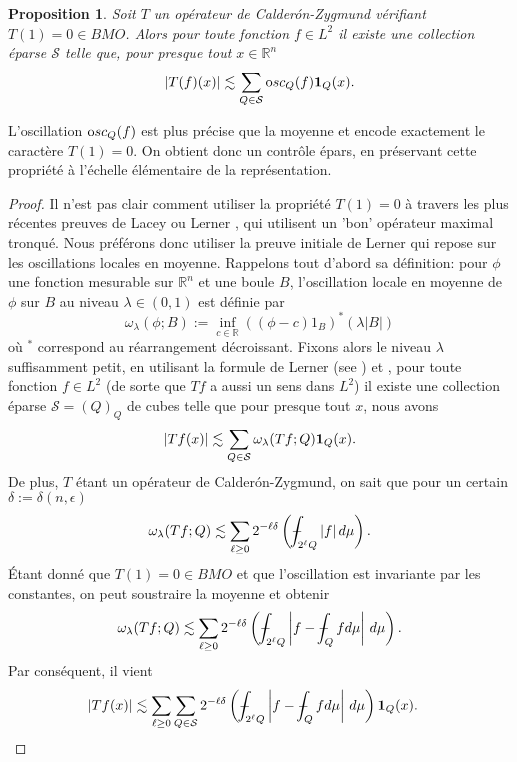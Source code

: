 \documentclass[11pt]{amsart}
\newtheorem{proposition}[theorem]{Proposition}
\newcommand{\rr}{\mathbb}
\newcommand{\osc}{{\textrm osc}}
\newcommand{\mcS}{{\mathcal S}}
\def\Xint#1{\mathchoice
   {\XXint\displaystyle\textstyle{#1}}%
   {\XXint\textstyle\scriptstyle{#1}}%
   {\XXint\scriptstyle\scriptscriptstyle{#1}}%
   {\XXint\scriptscriptstyle\scriptscriptstyle{#1}}%
   \!\int}
\def\XXint#1#2#3{{\setbox0=\hbox{$#1{#2#3}{\int}$}
     \vcenter{\hbox{$#2#3$}}\kern-.5\wd0}}
\def\aver#1{\Xint-_{#1}}
\begin{document}
\begin{proposition} \label{prop:question1} Soit $T$ un op\'erateur de Calder\'on-Zygmund v\'erifiant $T(1)=0 \in BMO$. Alors pour toute fonction $f\in L^2$ il existe une collection \'eparse $\mcS$ telle que, pour presque tout $x\in {\rr R}^n$ 
$$ \left|T(f)(x)\right| \lesssim \sum_{Q\in \mcS} \osc_Q(f) {\bf 1}_Q(x).$$
\end{proposition}

L'oscillation $\osc_Q(f)$ est plus pr\'ecise que la moyenne et encode exactement le caract\`ere $T(1)=0$. On obtient donc un contr\^ole \'epars, en pr\'eservant cette propri\'et\'e \`a l'\'echelle \'el\'ementaire de la repr\'esentation.

\begin{proof} Il n'est pas clair comment utiliser la propri\'et\'e $T(1)=0$ \`a travers les plus r\'ecentes preuves de Lacey \cite{LaceyA_2} ou Lerner \cite{Lerner4}, qui utilisent un 'bon' op\'erateur maximal tronqu\'e. Nous pr\'ef\'erons donc utiliser la preuve initiale de Lerner \cite{Lerner-simplerA_2} qui repose sur les oscillations locales en moyenne. Rappelons tout d'abord sa d\'efinition: pour $\phi$ une fonction mesurable sur ${\rr R}^n$ et une boule $B$, l'oscillation locale en moyenne de $\phi$ sur $B$ au niveau $\lambda\in(0,1)$ est d\'efinie par
$$ \omega_\lambda(\phi;B):= \inf_{c\in {\rr R}} \left((\phi-c)1_B\right)^*(\lambda|B|)$$
o\`u $^*$ correspond au r\'earrangement d\'ecroissant. Fixons alors le niveau $\lambda$ suffisamment petit, en utilisant la formule de Lerner (see \cite{Lerner1}) et \cite[Theorem 10.2]{LernerNazarov}, pour toute fonction $f\in L^2$ (de sorte que $Tf$ a aussi un sens dans $L^2$) il existe une collection \'eparse $\mcS=(Q)_Q$ de cubes telle que pour presque tout $x$, nous avons
$$ \left|Tf(x)\right| \lesssim \sum_{Q\in \mcS} \omega_{\lambda}(Tf;Q) {\bf 1}_Q(x).$$
De plus, $T$ \'etant un op\'erateur de Calder\'on-Zygmund, on sait que pour un certain $\delta:=\delta(n,\epsilon)$
$$ \omega_{\lambda}(Tf;Q) \lesssim \sum_{\ell \geq 0} 2^{-\ell \delta} \left(\aver{2^\ell Q} |f|\, d\mu\right).$$
\'Etant donn\'e que $T(1)=0\in BMO$ et que l'oscillation est invariante par les constantes, on peut soustraire la moyenne et obtenir
$$ \omega_{\lambda}(Tf;Q) \lesssim \sum_{\ell \geq 0} 2^{-\ell \delta} \left(\aver{2^\ell Q} \left|f - \aver{Q}f d\mu \right|\, d\mu\right).$$
Par cons\'equent, il vient
\begin{align*}
\left|Tf(x)\right| & \lesssim \sum_{\ell \geq 0} \sum_{Q\in \mcS}  2^{-\ell \delta} \left(\aver{2^\ell Q} \left|f - \aver{Q}f d\mu \right|\, d\mu\right) {\bf 1}_Q(x).

\end{align*}
\end{proof}
\end{document}

